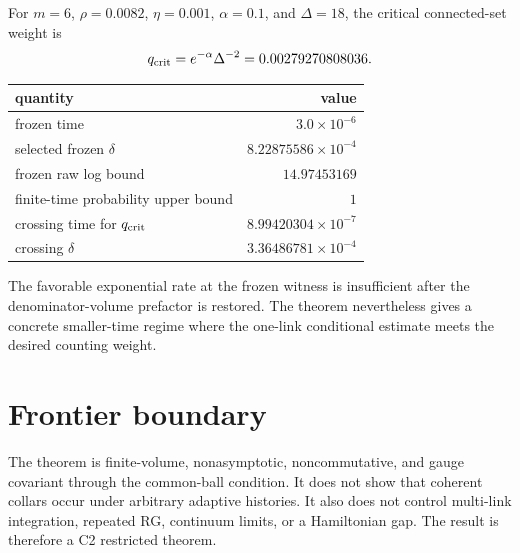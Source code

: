 \documentclass[11pt]{article}
\begin{document}
For $m=6$, $\rho=0.0082$, $\eta=0.001$, $\alpha=0.1$, and $\Delta=18$, the
critical connected-set weight is
\[
 q_{\rm crit}=e^{-\alpha}\Delta^{-2}=0.00279270808036.
\]
\begin{center}
\begin{tabular}{@{}lr@{}}
\toprule
quantity & value\\
\midrule
frozen time & $3.0\times10^{-6}$\\
selected frozen $\delta$ & $8.22875586\times10^{-4}$\\
frozen raw log bound & $14.97453169$\\
finite-time probability upper bound & $1$\\
crossing time for $q_{\rm crit}$ & $8.99420304\times10^{-7}$\\
crossing $\delta$ & $3.36486781\times10^{-4}$\\
\bottomrule
\end{tabular}
\end{center}

The favorable exponential rate at the frozen witness is insufficient after
the denominator-volume prefactor is restored.  The theorem nevertheless
gives a concrete smaller-time regime where the one-link conditional estimate
meets the desired counting weight.

\section{Frontier boundary}

The theorem is finite-volume, nonasymptotic, noncommutative, and gauge
covariant through the common-ball condition.  It does not show that coherent
collars occur under arbitrary adaptive histories.  It also does not control
multi-link integration, repeated RG, continuum limits, or a Hamiltonian gap.
The result is therefore a C2 restricted theorem.
\end{document}
